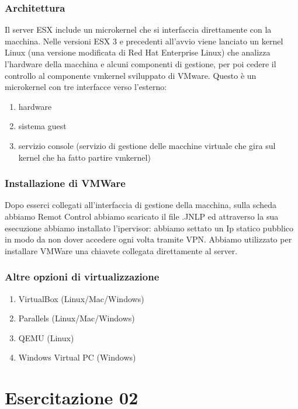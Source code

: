 \documentclass{article}
\begin{document}
\subsubsection{Architettura}
Il server ESX include un microkernel che si interfaccia direttamente con la macchina. Nelle versioni ESX 3 e precedenti all'avvio viene lanciato un kernel Linux (una versione modificata di Red Hat Enterprise Linux) che analizza l'hardware della macchina e alcuni componenti di gestione, per poi cedere il controllo al componente vmkernel sviluppato di VMware. Questo è un microkernel con tre interfacce verso l'esterno:
\begin{enumerate}
    \item hardware
    \item sistema guest
    \item servizio console (servizio di gestione delle macchine virtuale che gira sul kernel che ha fatto partire vmkernel)
\end{enumerate}

\subsubsection{Installazione di VMWare} 
    Dopo esserci collegati all'interfaccia di gestione della macchina, sulla scheda abbiamo
    Remot Control abbiamo scaricato il file .JNLP ed attraverso la sua esecuzione
    abbiamo installato l'ipervisor: abbiamo settato un Ip statico pubblico in modo da non dover
    accedere ogni volta tramite VPN. Abbiamo utilizzato per installare VMWare una chiavete collegata direttamente al server.
    
\subsubsection{Altre opzioni di virtualizzazione}
\begin{enumerate}
    \item VirtualBox (Linux/Mac/Windows)
    \item Parallels (Linux/Mac/Windows)
    \item QEMU (Linux)
    \item Windows Virtual PC (Windows)
\end{enumerate}

\section{Esercitazione 02}
\end{document}
